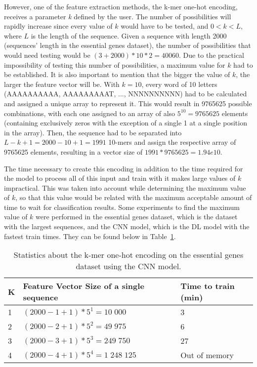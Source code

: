 However, one of the feature extraction methods, the k-mer one-hot encoding, receives a parameter \textit{k} defined by the user. The number of possibilities will rapidly increase since every value of $k$ would have to be tested, and $0 < k < L$, where $L$ is the length of the sequence. Given a sequence with length 2000 (sequences' length in the essential genes dataset), the number of possibilities that would need testing would be $(3+2000) * 10 * 2 = 40060$. Due to the practical impossibility of testing this number of possibilities, a maximum value for $k$ had to be established. It is also important to mention that the bigger the value of $k$, the larger the feature vector will be. With $k = 10$, every word of 10 letters (AAAAAAAAAA, AAAAAAAAAT, ..., NNNNNNNNNN) had to be calculated and assigned a unique array to represent it. This would result in 9765625 possible combinations, with each one assigned to an array of also $5^{10} = 9765625$ elements (containing exclusively zeros with the exception of a single 1 at a single position in the array). Then, the sequence had to be separated into $L-k+1 = 2000 - 10 + 1 = 1991$ 10-mers and assign the respective array of 9765625 elements, resulting in a vector size of $1991 * 9765625 = 1.94e10$.

The time necessary to create this encoding in addition to the time required for the model to process all of this input and train with it makes large values of $k$ impractical. This was taken into account while determining the maximum value of $k$, so that this value would be related with the maximum acceptable amount of time to wait for classification results. Some experiments to find the maximum value of $k$ were performed in the essential genes dataset, which is the dataset with the largest sequences, and the \gls{CNN} model, which is the \gls{DL} model with the fastest train times. They can be found below in Table~\ref{tab:stats_kmer}.

\begin{table}[ht]
	\caption{Statistics about the k-mer one-hot encoding on the essential genes dataset using the CNN model.}
	\label{tab:stats_kmer}
    \centering
    \begin{tabular}{lll}
    	\toprule
    	\textbf{K} & \textbf{Feature Vector Size of a single sequence} & \textbf{Time to train (min)}\\\midrule
    	
    	1 & $(2000 - 1 + 1) * 5^{1} = 10\;000$ & 3 \\\midrule
        2 & $(2000 - 2 + 1) * 5^{2} = 49\;975$ & 6\\\midrule
        3 & $(2000 - 3 + 1) * 5^{3} = 249\;750$ & 27\\\midrule
        4 & $(2000 - 4 + 1) * 5^{4} = 1\;248\;125$ & Out of memory\\
        
    	\bottomrule
    \end{tabular}
\end{table}

